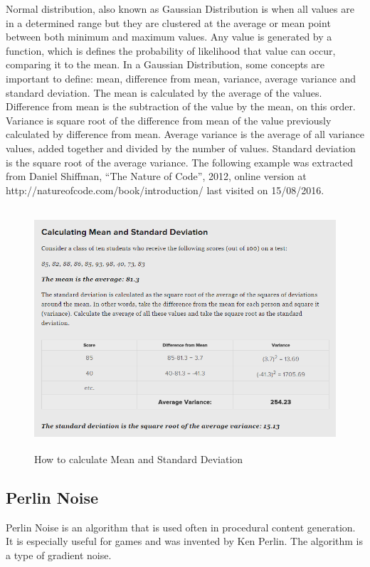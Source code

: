 \documentclass[a4paper,12pt]{book}
\begin{document}
Normal distribution, also known as Gaussian Distribution is when all values are in a determined range but they are clustered at the average or mean point between both minimum and maximum values.
Any value is generated by a function, which is defines the probability of likelihood that value can occur, comparing it to the mean.
In a Gaussian Distribution, some concepts are important to define: mean, difference from mean, variance, average variance and standard deviation.
The mean is calculated by the average of the values. 
Difference from mean is the subtraction of the value by the mean, on this order.
Variance is square root of the difference from mean of the value previously calculated by difference from mean.
Average variance is the average of all variance values, added together and divided by the number of values.
Standard deviation is the square root of the average variance.
The following example was extracted from Daniel Shiffman, “The Nature of Code”, 2012, online version at http://natureofcode.com/book/introduction/ last visited on 15/08/2016.

\begin{figure}
\begin{center}
\includegraphics[height=90mm]{normal_distribution-chart.png}
\end{center}
\caption{How to calculate Mean and Standard Deviation}
\label{fig:2.5}
\end{figure}

\subsection{Perlin Noise}

Perlin Noise is an algorithm that is used often in procedural content generation. It is especially useful for games and was invented by Ken Perlin.
The algorithm is a type of gradient noise.
\end{document}
